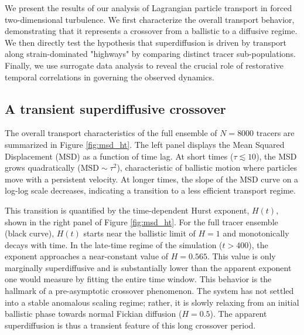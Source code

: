 \documentclass[]{article}
\begin{document}
We present the results of our analysis of Lagrangian particle transport in forced two-dimensional turbulence. We first characterize the overall transport behavior, demonstrating that it represents a crossover from a ballistic to a diffusive regime. We then directly test the hypothesis that superdiffusion is driven by transport along strain-dominated "highways" by comparing distinct tracer sub-populations. Finally, we use surrogate data analysis to reveal the crucial role of restorative temporal correlations in governing the observed dynamics.

\subsection{A transient superdiffusive crossover}

The overall transport characteristics of the full ensemble of $N=8000$ tracers are summarized in Figure \ref{fig:msd_ht}. The left panel displays the Mean Squared Displacement (MSD) as a function of time lag. At short times ($\tau \lesssim 10$), the MSD grows quadratically ($\text{MSD} \sim \tau^2$), characteristic of ballistic motion where particles move with a persistent velocity. At longer times, the slope of the MSD curve on a log-log scale decreases, indicating a transition to a less efficient transport regime.

This transition is quantified by the time-dependent Hurst exponent, $H(t)$, shown in the right panel of Figure \ref{fig:msd_ht}. For the full tracer ensemble (black curve), $H(t)$ starts near the ballistic limit of $H=1$ and monotonically decays with time. In the late-time regime of the simulation ($t > 400$), the exponent approaches a near-constant value of $H = 0.565$. This value is only marginally superdiffusive and is substantially lower than the apparent exponent one would measure by fitting the entire time window. This behavior is the hallmark of a pre-asymptotic crossover phenomenon. The system has not settled into a stable anomalous scaling regime; rather, it is slowly relaxing from an initial ballistic phase towards normal Fickian diffusion ($H=0.5$). The apparent superdiffusion is thus a transient feature of this long crossover period.
\end{document}
